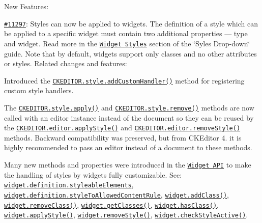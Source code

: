 New Features\+:


\begin{DoxyItemize}
\item \href{http://dev.ckeditor.com/ticket/11297}{\tt \#11297}\+: Styles can now be applied to widgets. The definition of a style which can be applied to a specific widget must contain two additional properties --- {\ttfamily type} and {\ttfamily widget}. Read more in the \href{http://docs.ckeditor.com/#!/guide/dev_styles-section-widget-styles}{\tt Widget Styles} section of the \char`\"{}\+Syles Drop-\/down\char`\"{} guide. Note that by default, widgets support only classes and no other attributes or styles. Related changes and features\+:
\begin{DoxyItemize}
\item Introduced the \href{http://docs.ckeditor.com/#!/api/CKEDITOR.style-static-method-addCustomHandler}{\tt {\ttfamily C\+K\+E\+D\+I\+T\+O\+R.\+style.\+add\+Custom\+Handler()}} method for registering custom style handlers.
\item The \href{http://docs.ckeditor.com/#!/api/CKEDITOR.style-method-apply}{\tt {\ttfamily C\+K\+E\+D\+I\+T\+O\+R.\+style.\+apply()}} and \href{http://docs.ckeditor.com/#!/api/CKEDITOR.style-method-remove}{\tt {\ttfamily C\+K\+E\+D\+I\+T\+O\+R.\+style.\+remove()}} methods are now called with an editor instance instead of the document so they can be reused by the \href{http://docs.ckeditor.com/#!/api/CKEDITOR.editor-method-applyStyle}{\tt {\ttfamily C\+K\+E\+D\+I\+T\+O\+R.\+editor.\+apply\+Style()}} and \href{http://docs.ckeditor.com/#!/api/CKEDITOR.editor-method-removeStyle}{\tt {\ttfamily C\+K\+E\+D\+I\+T\+O\+R.\+editor.\+remove\+Style()}} methods. Backward compatibility was preserved, but from C\+K\+Editor 4. it is highly recommended to pass an editor instead of a document to these methods.
\item Many new methods and properties were introduced in the \href{http://docs.ckeditor.com/#!/api/CKEDITOR.plugins.widget}{\tt Widget A\+PI} to make the handling of styles by widgets fully customizable. See\+: \href{http://docs.ckeditor.com/#!/api/CKEDITOR.plugins.widget.definition-property-styleableElements}{\tt {\ttfamily widget.\+definition.\+styleable\+Elements}}, \href{http://docs.ckeditor.com/#!/api/CKEDITOR.plugins.widget.definition-property-styleToAllowedContentRules}{\tt {\ttfamily widget.\+definition.\+style\+To\+Allowed\+Content\+Rule}}, \href{http://docs.ckeditor.com/#!/api/CKEDITOR.plugins.widget-method-addClass}{\tt {\ttfamily widget.\+add\+Class()}}, \href{http://docs.ckeditor.com/#!/api/CKEDITOR.plugins.widget-method-removeClass}{\tt {\ttfamily widget.\+remove\+Class()}}, \href{http://docs.ckeditor.com/#!/api/CKEDITOR.plugins.widget-method-getClasses}{\tt {\ttfamily widget.\+get\+Classes()}}, \href{http://docs.ckeditor.com/#!/api/CKEDITOR.plugins.widget-method-hasClass}{\tt {\ttfamily widget.\+has\+Class()}}, \href{http://docs.ckeditor.com/#!/api/CKEDITOR.plugins.widget-method-applyStyle}{\tt {\ttfamily widget.\+apply\+Style()}}, \href{http://docs.ckeditor.com/#!/api/CKEDITOR.plugins.widget-method-removeStyle}{\tt {\ttfamily widget.\+remove\+Style()}}, \href{http://docs.ckeditor.com/#!/api/CKEDITOR.plugins.widget-method-checkStyleActive}{\tt {\ttfamily widget.\+check\+Style\+Active()}}.

\end{DoxyItemize}
\end{DoxyItemize}
